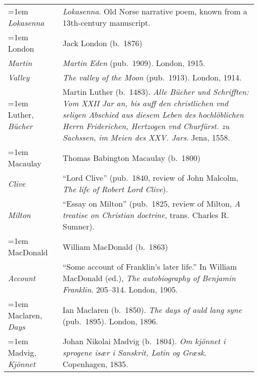 \begin{xltabular}{\textwidth}{ lQ }
\hangindent=1em  \textit{Lokasenna} & \textit{Lokasenna}. Old Norse narrative poem, known from a 13th-century manuscript. \\

\hangindent=1em  London & Jack London (b.~1876) \\
\hspace{1em}\textit{Martin} & \textit{Martin Eden} (pub.~1909). London, 1915. \\
\hspace{1em}\textit{Valley} & \textit{The valley of the Moon} (pub.~1913). London, 1914. \\

\hangindent=1em  Luther, \textit{Bücher} & Martin Luther (b.~1483). \textit{Alle Bücher und Schrifften: Vom XXII Jar an, bis auff den christlichen vnd seligen Abschied aus diesem Leben des hochlöblichen Herrn Friderichen, Hertzogen vnd Churfürst. zu Sachssen, im Meien des XXV. Jars}. Jena, 1558. \\ %

\hangindent=1em  Macaulay & Thomas Babington Macaulay (b.~1800) \\
\hspace{1em}\textit{Clive} & ``Lord Clive'' (pub.~1840, review of John Malcolm, \textit{The life of Robert Lord Clive}). \\
\hspace{1em}\textit{Milton} & ``Essay on Milton'' (pub.~1825, review of Milton, \textit{A treatise on Christian doctrine}, trans. Charles R. Sumner). \\ %

\hangindent=1em  MacDonald & William MacDonald (b.~1863)\\
\hspace{1em}\textit{Account} & ``Some account of Franklin's later life.'' In William MacDonald (ed.), \textit{The autobiography of Benjamin Franklin}. 205--314. London, 1905. \\

\hangindent=1em  Maclaren, \textit{Days} & Ian Maclaren (b.~1850). \textit{The days of auld lang syne} (pub.~1895). London, 1896. \\ %

\hangindent=1em  Madvig, \textit{Kjönnet} & Johan Nikolai Madvig (b.~1804). \textit{Om kjönnet i sprogene især i Sanskrit, Latin og Græsk}. Copenhagen, 1835. \\


\end{xltabular}
